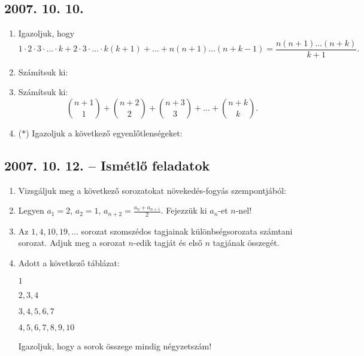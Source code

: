 \subsection*{2007. 10. 10.}
\begin{enumerate}
\item Igazoljuk, hogy 
$$1\cdot 2\cdot 3\cdot\ldots\cdot k+
2\cdot 3\cdot\ldots\cdot k(k+1)+\ldots+
n(n+1)\ldots(n+k-1)=\frac{n(n+1)\ldots(n+k)}{k+1}.$$ 
\item Számítsuk ki:
\item Számítsuk ki:
$$\binom{n+1}{1}+\binom{n+2}{2}+\binom{n+3}{3}+\ldots+\binom{n+k}{k}.$$
\item ($*$) Igazoljuk a következő egyenlőtlenségeket:
\end{enumerate}

\subsection*{2007. 10. 12. -- Ismétlő feladatok}
\begin{enumerate}
\item Vizsgáljuk meg a következő sorozatokat növekedés-fogyás szempontjából:
\item Legyen $a_1=2$, $a_2=1$, $a_{n+2}=\frac{a_n+a_{n+1}}{2}$. Fejezzük ki $a_n$-et $n$-nel!
\item Az $1, 4, 10, 19,\ldots$ sorozat szomszédos tagjainak különbségsorozata számtani sorozat. Adjuk meg a sorozat $n$-edik tagját és első $n$ tagjának összegét.
\item Adott a következő táblázat:

$1$

$2, 3, 4$

$3, 4, 5, 6, 7$

$4, 5, 6, 7, 8, 9, 10$

\noindent Igazoljuk, hogy a sorok összege mindig négyzetszám!
\end{enumerate}

